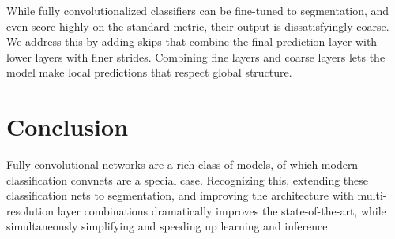 \documentclass[a4paper,12pt]{article}
\begin{document}
While fully convolutionalized classifiers can be fine-tuned to segmentation, and even score highly on the standard metric, their output is dissatisfyingly coarse. We address this by adding skips that combine the final prediction layer with lower layers with finer strides. Combining fine layers and coarse layers lets the model make local predictions that respect global structure.

\section{Conclusion}

Fully convolutional networks are a rich class of models, of which modern classification convnets are a special case. Recognizing this, extending these classification nets to segmentation, and improving the architecture with multi-resolution layer combinations dramatically improves the state-of-the-art, while simultaneously simplifying and speeding up learning and inference.
\end{document}

